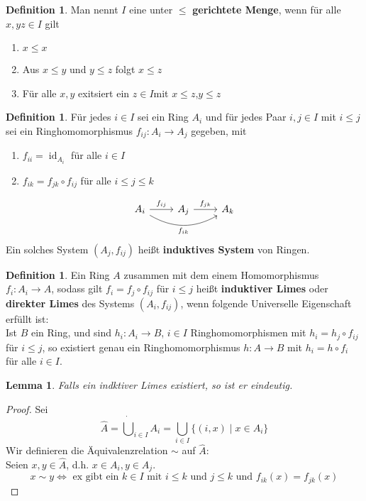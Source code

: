 \documentclass[10pt,a4paper]{article}
\newcommand{\id}{\operatorname{id}}
\theoremstyle{plain}
\newtheorem{lem}[theorem]{Lemma}
\theoremstyle{definition}
\newtheorem{definition}[theorem]{Definition}
\theoremstyle{remark}
\begin{document}
	\begin{definition}
		Man nennt $I$ eine unter $\leq$ \textbf{gerichtete Menge}, wenn für alle $x,yz\in I$ gilt
		\begin{enumerate}
			\item $x\leq x$
			\item Aus $x\leq y$ und $y\leq z$ folgt $x\leq z$
			\item Für alle $x,y$ exitsiert ein $z\in I$mit $x\leq z$,$y\leq z$
		\end{enumerate}
	\end{definition}

	\begin{definition}
		Für jedes $i\in I$ sei ein Ring $A_i$ und für jedes Paar $i,j\in I$ mit $i\leq j$ sei ein Ringhomomorphismus $f_{ij}:A_i\to A_j$ gegeben, mit
		\begin{enumerate}
			\item $f_{ii}=\id_{A_i}$ für alle $i\in I$
			\item $f_{ik}=f_{jk}\circ f_{ij}$ für alle $i\leq j\leq k$
		\end{enumerate}
		\[\begin{tikzcd}
			A_i\ar[r,"f_{ij}"] \ar[rr,"f_{ik}"',bend right] &A_j\ar[r,"f_{jk}"]&A_k
		\end{tikzcd}\]
		Ein solches System $(A_j,f_{ij})$ heißt \textbf{induktives System} von Ringen.
	\end{definition}

	\begin{definition}
		Ein Ring $A$ zusammen mit dem einem Homomorphismus $f_i:A_i\to A$, sodass gilt $f_i=f_j\circ f_{ij}$ für $i\leq j$ heißt \textbf{induktiver Limes} oder \textbf{direkter Limes} des Systems $(A_i,f_{ij})$, wenn folgende Universelle Eigenschaft erfüllt ist:\\
		Ist $B$ ein Ring, und sind $h_i:A_i\to B$, $i\in I$ Ringhomomorphismen mit $h_i=h_j\circ f_{ij}$ für $i\leq j$, so existiert genau ein Ringhomomorphismus $h:A\to B$ mit $h_i=h\circ f_i$ für alle $i\in I$.
	\end{definition}

	\begin{lem}
		Falls ein indktiver Limes existiert, so ist er eindeutig.
	\end{lem}
	\begin{proof}
		Sei 
		\[\hat A=\dot\bigcup_{i\in I}A_i=\bigcup_{i\in I}\{(i,x)\mid x\in A_i\}\]
		Wir definieren die Äquivalenzrelation $\sim$ auf $\hat A$:\\
		Seien $x,y\in \hat A$, d.h. $x\in A_i,y\in A_j$.
		\[x\sim y\Leftrightarrow \text{ ex gibt ein $k\in I$ mit $i\leq k$ und $j\leq k$ und $f_{ik}(x)=f_{jk}(x)$}\]
	\end{proof}
\end{document}
